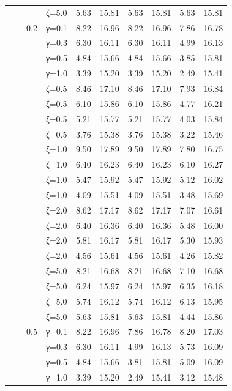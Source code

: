 \begin{table}[htbp]
\begin{tabular}{ll r l  rr  rr  rr}
  &  &  & ζ=5.0 & 5.63 & 15.81 & 5.63 & 15.81 & 5.63 & 15.81 \\
  &  & 0.2 & γ=0.1 & 8.22 & 16.96 & 8.22 & 16.96 & 7.86 & 16.78 \\
  &  &  & γ=0.3 & 6.30 & 16.11 & 6.30 & 16.11 & 4.99 & 16.13 \\
  &  &  & γ=0.5 & 4.84 & 15.66 & 4.84 & 15.66 & 3.85 & 15.81 \\
  &  &  & γ=1.0 & 3.39 & 15.20 & 3.39 & 15.20 & 2.49 & 15.41 \\
  &  &  & ζ=0.5 & 8.46 & 17.10 & 8.46 & 17.10 & 7.93 & 16.84 \\
  &  &  & ζ=0.5 & 6.10 & 15.86 & 6.10 & 15.86 & 4.77 & 16.21 \\
  &  &  & ζ=0.5 & 5.21 & 15.77 & 5.21 & 15.77 & 4.03 & 15.84 \\
  &  &  & ζ=0.5 & 3.76 & 15.38 & 3.76 & 15.38 & 3.22 & 15.46 \\
  &  &  & ζ=1.0 & 9.50 & 17.89 & 9.50 & 17.89 & 7.80 & 16.75 \\
  &  &  & ζ=1.0 & 6.40 & 16.23 & 6.40 & 16.23 & 6.10 & 16.27 \\
  &  &  & ζ=1.0 & 5.47 & 15.92 & 5.47 & 15.92 & 5.12 & 16.02 \\
  &  &  & ζ=1.0 & 4.09 & 15.51 & 4.09 & 15.51 & 3.48 & 15.69 \\
  &  &  & ζ=2.0 & 8.62 & 17.17 & 8.62 & 17.17 & 7.07 & 16.61 \\
  &  &  & ζ=2.0 & 6.40 & 16.36 & 6.40 & 16.36 & 5.48 & 16.00 \\
  &  &  & ζ=2.0 & 5.81 & 16.17 & 5.81 & 16.17 & 5.30 & 15.93 \\
  &  &  & ζ=2.0 & 4.56 & 15.61 & 4.56 & 15.61 & 4.26 & 15.82 \\
  &  &  & ζ=5.0 & 8.21 & 16.68 & 8.21 & 16.68 & 7.10 & 16.68 \\
  &  &  & ζ=5.0 & 6.24 & 15.97 & 6.24 & 15.97 & 6.35 & 16.18 \\
  &  &  & ζ=5.0 & 5.74 & 16.12 & 5.74 & 16.12 & 6.13 & 15.95 \\
  &  &  & ζ=5.0 & 5.63 & 15.81 & 5.63 & 15.81 & 4.44 & 15.86 \\
  &  & 0.5 & γ=0.1 & 8.22 & 16.96 & 7.86 & 16.78 & 8.20 & 17.03 \\
  &  &  & γ=0.3 & 6.30 & 16.11 & 4.99 & 16.13 & 5.73 & 16.09 \\
  &  &  & γ=0.5 & 4.84 & 15.66 & 3.81 & 15.81 & 5.09 & 16.09 \\
  &  &  & γ=1.0 & 3.39 & 15.20 & 2.49 & 15.41 & 3.12 & 15.48 \\

\end{tabular}
\end{table}
